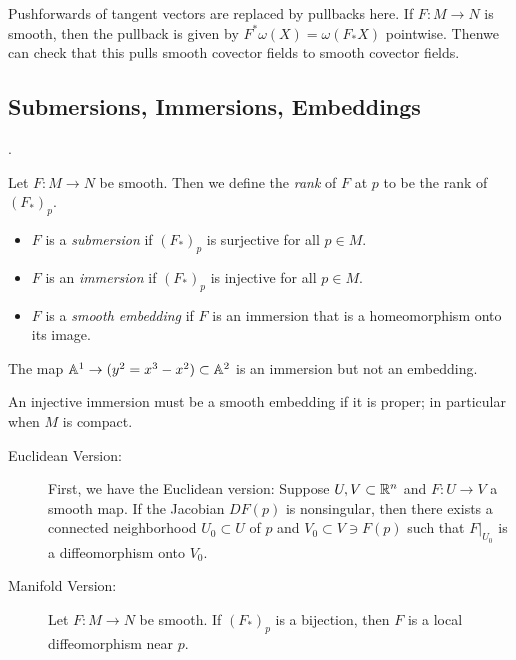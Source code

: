 \documentclass[twoside, 10pt]{article}
\begin{document}
    Pushforwards of tangent vectors are replaced by pullbacks here. If $F:M \to N$ is smooth, then the pullback is given by $F^*\omega(X) = \omega(F_*X)$ pointwise. Thenwe can check that this pulls smooth covector fields to smooth covector fields.

    \subsection{Submersions, Immersions, Embeddings}.
    \label{sub:submersions_immersions_embeddings}

    \begin{defn}
        Let $F:M \to N$ be smooth. Then we define the \textit{rank} of $F$ at $p$ to be the rank of $(F_*)_p$.
        \begin{itemize}
            \item $F$ is a \textit{submersion} if $(F_*)_p$ is surjective for all $p \in M$.
            \item $F$ is an \textit{immersion} if $(F_*)_p$ is injective for all $p \in M$.
            \item $F$ is a \textit{smooth embedding} if $F$ is an immersion that is a homeomorphism onto its image.
        \end{itemize}
    \end{defn}%

    \begin{exm}
        The map $\mathbb{A}^1 \to (y^2 = x^3-x^2) \subset \mathbb{A}^2$ is an immersion but not an embedding.
    \end{exm}

    \begin{rmk}
        An injective immersion must be a smooth embedding if it is proper; in particular when $M$ is compact.
    \end{rmk}

    \begin{thm}
        \begin{description}
            \item[Euclidean Version:] First, we have the Euclidean version: Suppose $U,V \subset \mathbb{R}^n$ and $F:U \to V$ a smooth map. If the Jacobian $DF(p)$ is nonsingular, then there exists a connected neighborhood $U_0 \subset U$ of $p$ and $V_0 \subset V \ni F(p)$ such that $F|_{U_0}$ is a diffeomorphism onto $V_0$.
            \item[Manifold Version:] Let $F:M \to N$ be smooth. If $(F_*)_p$ is a bijection, then $F$ is a local diffeomorphism near $p$.
        \end{description}
    \end{thm}
\end{document}
